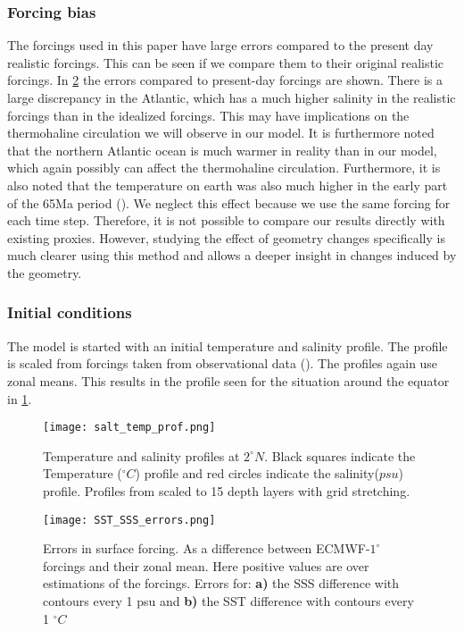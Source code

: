 \begin{multicols}{2}
 \subsubsection{Forcing bias} \label{sec:forc_err}
The forcings used in this paper have large errors compared to the present day realistic forcings. This can be seen if we compare them to their original realistic forcings. In \cref{fig:sss_sst_errors} the errors compared to present-day forcings are shown. There is a large discrepancy in the Atlantic, which has a much higher salinity in the realistic forcings than in the idealized forcings. This may have implications on the thermohaline circulation we will observe in our model. It is furthermore noted that the northern Atlantic ocean is much warmer in reality than in our model, which again possibly can affect the thermohaline circulation.
Furthermore, it is also noted that the temperature on earth was also much higher in the early part of the 65Ma period (\cite{Hansen2013Oct}). We neglect this effect because we use the same forcing for each time step. Therefore, it is not possible to compare our results directly with existing proxies. However, studying the effect of geometry changes specifically is much clearer using this method and allows a deeper insight in changes induced by the geometry.
 \subsubsection{Initial conditions}
The model is started with an initial temperature and salinity profile. The profile is scaled from forcings taken from observational data (\cite{ECMWFForc}). The profiles again use zonal means. This results in the profile seen for the situation around the equator in \cref{fig:salt_temp_prf}.

\begin{figure}[H]
	\texttt{[image: salt\_temp\_prof.png]}
	\caption{Temperature and salinity profiles at $2^{\circ} N$. Black squares indicate the Temperature ($^{\circ}C$) profile and red circles indicate the salinity($psu$) profile. Profiles from \cite{ECMWFForc} scaled to 15 depth layers with grid stretching.}
	\label{fig:salt_temp_prf}
\end{figure}
\end{multicols}
\begin{figure}[H]
	\texttt{[image: SST\_SSS\_errors.png]}
	\caption{Errors in surface forcing. As a difference between ECMWF-$1^{\circ}$ forcings and their zonal mean.  Here positive values are over estimations of the forcings. Errors for: \textbf{a)} the SSS difference with contours every 1 psu and \textbf{b)} the SST difference with contours every 1 $^{\circ}C$}
	\label{fig:sss_sst_errors}
\end{figure}
